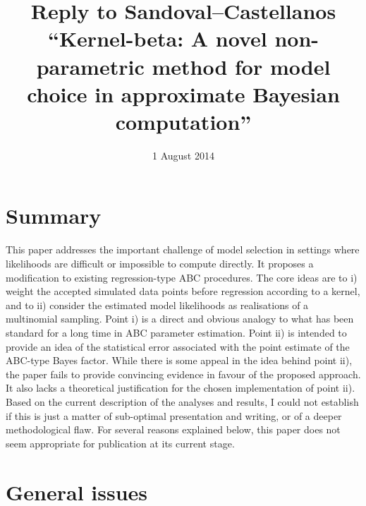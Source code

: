 \documentclass[11pt]{article}
\title{Reply to Sandoval--Castellanos ``Kernel-beta: A novel non-parametric method for model choice in approximate Bayesian computation''}
\date{1 August 2014}                                           %
\begin{document}
\maketitle

\section{Summary}
This paper addresses the important challenge of model selection in settings where likelihoods are difficult or impossible to compute directly. It proposes a modification to existing regression-type ABC procedures. The core ideas are to i) weight the accepted simulated data points before regression according to a kernel, and to ii) consider the estimated model likelihoods as realisations of a multinomial sampling. Point i) is a direct and obvious analogy to what has been standard for a long time in ABC parameter estimation. Point ii) is intended to provide an idea of the statistical error associated with the point estimate of the ABC-type Bayes factor. While there is some appeal in the idea behind point ii), the paper fails to provide convincing evidence in favour of the proposed approach. It also lacks a theoretical justification for the chosen implementation of point ii). Based on the current description of the analyses and results, I could not establish if this is just a matter of sub-optimal presentation and writing, or of a deeper methodological flaw. For several reasons explained below, this paper does not seem appropriate for publication at its current stage.

\section{General issues}
\end{document}
